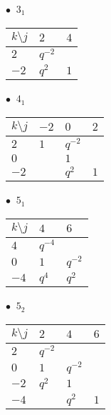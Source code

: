 \begin{minipage}{\linewidth}
$\bullet\ $ $3_{1}$ \vspace{0.5em} \\
\begin{tabular}{l|ll}
$k \setminus j$ & $2$ & $4$ \\
\hline
$2$ & $q^{-2}$ &  \\
$-2$ & $q^{2}$ & $1$ \\
\end{tabular}
\vspace{2em}
\end{minipage}
%
\begin{minipage}{\linewidth}
$\bullet\ $ $4_{1}$ \vspace{0.5em} \\
\begin{tabular}{l|lll}
$k \setminus j$ & $-2$ & $0$ & $2$ \\
\hline
$2$ & $1$ & $q^{-2}$ &  \\
$0$ &  & $1$ &  \\
$-2$ &  & $q^{2}$ & $1$ \\
\end{tabular}
\vspace{2em}
\end{minipage}
%
\begin{minipage}{\linewidth}
$\bullet\ $ $5_{1}$ \vspace{0.5em} \\
\begin{tabular}{l|ll}
$k \setminus j$ & $4$ & $6$ \\
\hline
$4$ & $q^{-4}$ &  \\
$0$ & $1$ & $q^{-2}$ \\
$-4$ & $q^{4}$ & $q^{2}$ \\
\end{tabular}
\vspace{2em}
\end{minipage}
%
\begin{minipage}{\linewidth}
$\bullet\ $ $5_{2}$ \vspace{0.5em} \\
\begin{tabular}{l|lll}
$k \setminus j$ & $2$ & $4$ & $6$ \\
\hline
$2$ & $q^{-2}$ &  &  \\
$0$ & $1$ & $q^{-2}$ &  \\
$-2$ & $q^{2}$ & $1$ &  \\
$-4$ &  & $q^{2}$ & $1$ \\
\end{tabular}
\vspace{2em}
\end{minipage}
